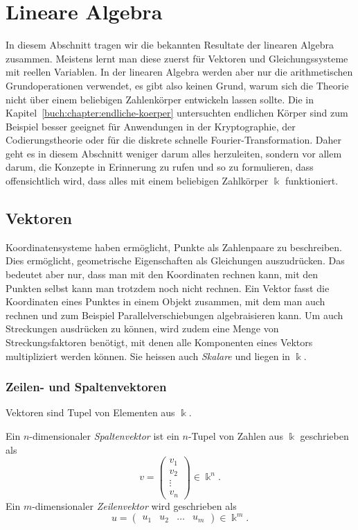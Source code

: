 %
%
%
\section{Lineare Algebra
\label{buch:grundlagen:section:linearealgebra}}
In diesem Abschnitt tragen wir die bekannten Resultate der linearen
Algebra zusammen.
Meistens lernt man diese zuerst für Vektoren und Gleichungssysteme mit
reellen Variablen.
In der linearen Algebra werden aber nur die arithmetischen
Grundoperationen verwendet, es gibt also keinen Grund, warum sich
die Theorie nicht über einem beliebigen Zahlenkörper entwickeln
lassen sollte.
Die in Kapitel~\ref{buch:chapter:endliche-koerper} untersuchten
endlichen Körper sind zum Beispiel besser geeignet für Anwendungen in
der Kryptographie, der Codierungstheorie oder für die diskrete schnelle
Fourier-Transformation.
Daher geht es in diesem Abschnitt weniger darum alles herzuleiten,
sondern vor allem darum, die Konzepte in Erinnerung zu rufen und
so zu formulieren, dass offensichtlich wird, dass alles mit einem
beliebigen Zahlkörper $\Bbbk$ funktioniert.

%
%
\subsection{Vektoren
\label{buch:grundlagen:subsection:vektoren}}
Koordinatensysteme haben ermöglicht, Punkte als Zahlenpaare zu beschreiben.
Dies ermöglicht, geometrische Eigenschaften als Gleichungen auszudrücken.
Das bedeutet aber nur, dass man mit den Koordinaten rechnen kann,
mit den Punkten selbst kann man trotzdem noch nicht rechnen.
Ein Vektor fasst die Koordinaten eines Punktes in einem Objekt zusammen,
mit dem man auch rechnen und zum Beispiel Parallelverschiebungen
algebraisieren kann.
Um auch Streckungen ausdrücken zu können, wird zudem eine Menge von
Streckungsfaktoren benötigt, mit denen alle Komponenten eines Vektors
multipliziert werden können.
Sie heissen auch {\em Skalare} und liegen in $\Bbbk$.

\subsubsection{Zeilen- und Spaltenvektoren}
Vektoren sind Tupel von Elementen aus $\Bbbk$.
%

\begin{definition}
Ein $n$-dimensionaler {\em Spaltenvektor} ist ein $n$-Tupel von Zahlen aus
%
$\Bbbk$ geschrieben als
\[
v = \begin{pmatrix} v_1\\v_2\\\vdots\\v_n\end{pmatrix}
\in \Bbbk^n.
\]
Ein $m$-dimensionaler {\em Zeilenvektor} wird geschrieben als
%
\[
u = \begin{pmatrix}u_1&u_2&\dots&u_m\end{pmatrix} \in \Bbbk^m.
\]
\end{definition}

